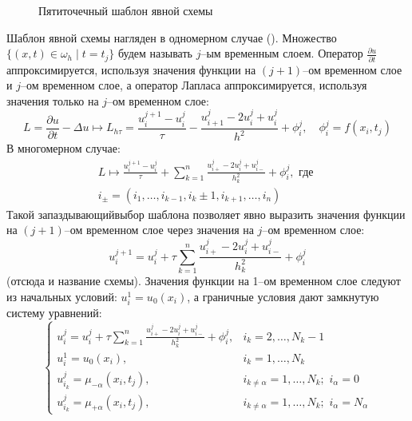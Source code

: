 \begin{figure}[h]
    \centering
    \caption{Пятиточечный шаблон явной схемы}
    \label{fig:ExplicitTemplate}
\end{figure}
Шаблон явной схемы нагляден в одномерном случае ().
Множество $\{(x, t) \in \omega_h \mid t = t_j\}$ будем называть $j$--ым временным слоем.
Оператор $\frac{\partial u}{\partial t}$ аппроксимируется, используя значения функции на $(j + 1)$--ом временном слое и $j$--ом временном слое, а оператор Лапласа аппроксимируется, используя значения только на $j$--ом временном слое:
\begin{equation*}
    L = \frac{\partial u}{\partial t} - \Delta u \mapsto 
    L_{h\tau} = \frac{u_i^{j + 1} - u_i^j}{\tau} - 
    \frac{u_{i + 1}^j - 2u_i^j + u_i^j}{h^2} + \phi_i^j,\quad \phi_i^j = f(x_i, t_j)
\end{equation*}
В многомерном случае:
\begin{multline*}
    L \mapsto 
    \frac{u_i^{j + 1} - u_i^j}{\tau} + \sum\limits_{k = 1}^{n}
    \frac{u_{i+}^j - 2u_i^j + u_{i-}^j}{h_k^2} + \phi_i^j,\text{ где }\\
    i_{\pm} = (i_1, \ldots, i_{k - 1}, i_k \pm 1, i_{k + 1}, \ldots, i_n)
\end{multline*}
Такой \glqq запаздывающий\grqq выбор шаблона позволяет явно выразить значения функции на $(j + 1)$--ом временном слое через значения на $j$--ом временном слое:
\begin{equation}\label{eq:explicit_scheme}
    u_i^{j + 1} = u_i^j + \tau \sum\limits_{k = 1}^{n}
    \frac{u_{i+}^j - 2u_i^j + u_{i-}^j}{h_k^2} + \phi_i^j
\end{equation}
(отсюда и название схемы). Значения функции на 1--ом временном слое следуют из начальных условий: $u_i^1 = u_0(x_i)$, а граничные условия дают замкнутую систему уравнений:
\begin{equation*}
    \begin{cases}
        u_i^{j} = u_i^j + \tau \sum\limits_{k = 1}^{n} \frac{u_{i+}^j - 2u_i^j + u_{i-}^j}{h_k^2} + \phi_i^j, & i_k = 2, \ldots, N_k - 1\\
        u_i^1 = u_0(x_i), & i_k = 1, \ldots, N_k\\
        u_{i_k}^{j} = \mu_{-\alpha}(x_i, t_j), & i_{k \ne \alpha} = 1, \ldots, N_k;\,\, i_{\alpha} = 0\\
        u_{i_k}^{j} = \mu_{+\alpha}(x_i, t_j), & i_{k \ne \alpha} = 1, \ldots, N_k;\,\, i_{\alpha} = N_{\alpha}
    \end{cases}
\end{equation*}
